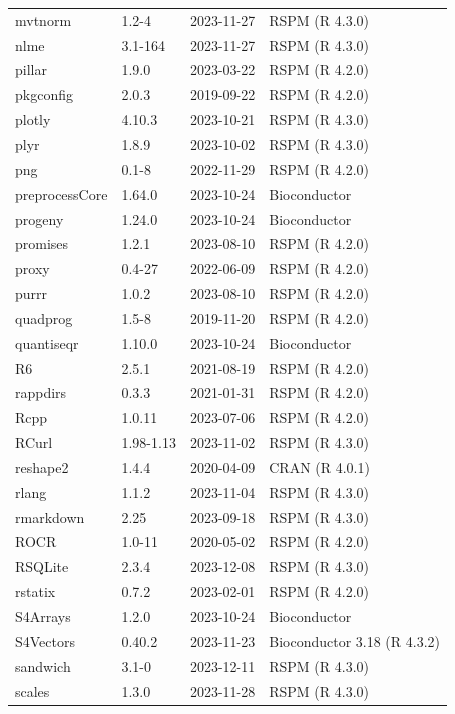 \documentclass[graybox]{svmult}
\begin{document}
\begin{tabular}{llll}
\addlinespace
mvtnorm & 1.2-4 & 2023-11-27 & RSPM (R 4.3.0)\\
nlme & 3.1-164 & 2023-11-27 & RSPM (R 4.3.0)\\
pillar & 1.9.0 & 2023-03-22 & RSPM (R 4.2.0)\\
pkgconfig & 2.0.3 & 2019-09-22 & RSPM (R 4.2.0)\\
plotly & 4.10.3 & 2023-10-21 & RSPM (R 4.3.0)\\
\addlinespace
plyr & 1.8.9 & 2023-10-02 & RSPM (R 4.3.0)\\
png & 0.1-8 & 2022-11-29 & RSPM (R 4.2.0)\\
preprocessCore & 1.64.0 & 2023-10-24 & Bioconductor\\
progeny & 1.24.0 & 2023-10-24 & Bioconductor\\
promises & 1.2.1 & 2023-08-10 & RSPM (R 4.2.0)\\
\addlinespace
proxy & 0.4-27 & 2022-06-09 & RSPM (R 4.2.0)\\
purrr & 1.0.2 & 2023-08-10 & RSPM (R 4.2.0)\\
quadprog & 1.5-8 & 2019-11-20 & RSPM (R 4.2.0)\\
quantiseqr & 1.10.0 & 2023-10-24 & Bioconductor\\
R6 & 2.5.1 & 2021-08-19 & RSPM (R 4.2.0)\\
\addlinespace
rappdirs & 0.3.3 & 2021-01-31 & RSPM (R 4.2.0)\\
Rcpp & 1.0.11 & 2023-07-06 & RSPM (R 4.2.0)\\
RCurl & 1.98-1.13 & 2023-11-02 & RSPM (R 4.3.0)\\
reshape2 & 1.4.4 & 2020-04-09 & CRAN (R 4.0.1)\\
rlang & 1.1.2 & 2023-11-04 & RSPM (R 4.3.0)\\
\addlinespace
rmarkdown & 2.25 & 2023-09-18 & RSPM (R 4.3.0)\\
ROCR & 1.0-11 & 2020-05-02 & RSPM (R 4.2.0)\\
RSQLite & 2.3.4 & 2023-12-08 & RSPM (R 4.3.0)\\
rstatix & 0.7.2 & 2023-02-01 & RSPM (R 4.2.0)\\
S4Arrays & 1.2.0 & 2023-10-24 & Bioconductor\\
\addlinespace
S4Vectors & 0.40.2 & 2023-11-23 & Bioconductor 3.18 (R 4.3.2)\\
sandwich & 3.1-0 & 2023-12-11 & RSPM (R 4.3.0)\\
scales & 1.3.0 & 2023-11-28 & RSPM (R 4.3.0)\\

\end{tabular}
\end{document}
